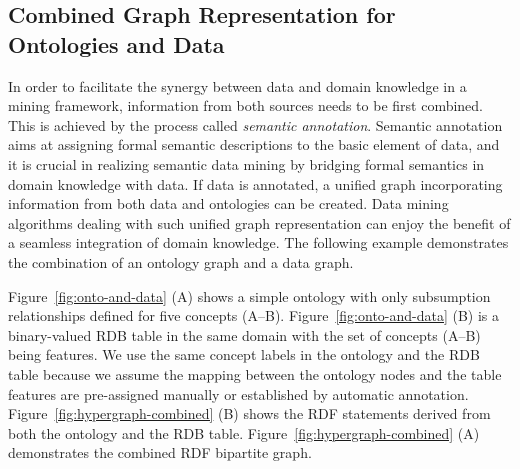 \subsection{Combined Graph Representation for Ontologies and Data}
In order to facilitate the synergy between data and domain knowledge in a mining framework, information from both sources needs to be first combined. This is achieved by the process called \emph{semantic annotation}. Semantic annotation aims at assigning formal semantic descriptions to the basic element of data, and it is crucial in realizing semantic data mining by bridging formal semantics in domain knowledge with data. If data is annotated, a unified graph incorporating information from both data and ontologies can be created. Data mining algorithms dealing with such unified graph representation can enjoy the benefit of a seamless integration of domain knowledge. The following example demonstrates the combination of an ontology graph and a data graph.

Figure~\ref{fig:onto-and-data} (A) shows a simple ontology with only subsumption relationships defined for five concepts (A--B). Figure~\ref{fig:onto-and-data} (B) is a binary-valued RDB table in the same domain with the set of concepts (A--B) being features. We use the same concept labels in the ontology and the RDB table because we assume the mapping between the ontology nodes and the table features are pre-assigned manually or established by automatic annotation. Figure~\ref{fig:hypergraph-combined} (B) shows the RDF statements derived from both the ontology and the RDB table. Figure~\ref{fig:hypergraph-combined} (A) demonstrates the combined RDF bipartite graph.

